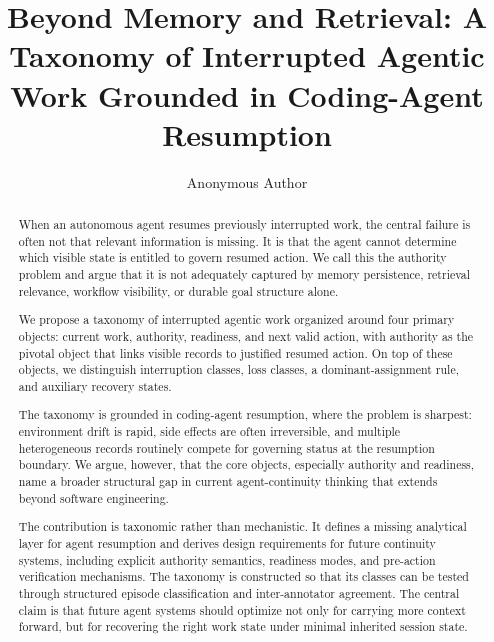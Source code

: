 \documentclass[a4paper,fleqn]{cas-dc}
\begin{document}
\let\WriteBookmarks\relax
\def\floatpagepagefraction{1}
\def\textpagefraction{.001}
\setlength{\stripsep}{8pt plus 2pt minus 2pt}

\title[mode=title]{Beyond Memory and Retrieval: A Taxonomy of Interrupted Agentic Work Grounded in Coding-Agent Resumption}

\author[1]{Anonymous Author}

\begin{abstract}
When an autonomous agent resumes previously interrupted work, the central failure is often not that relevant information is missing. It is that the agent cannot determine which visible state is entitled to govern resumed action. We call this the authority problem and argue that it is not adequately captured by memory persistence, retrieval relevance, workflow visibility, or durable goal structure alone.

We propose a taxonomy of interrupted agentic work organized around four primary objects: current work, authority, readiness, and next valid action, with authority as the pivotal object that links visible records to justified resumed action. On top of these objects, we distinguish interruption classes, loss classes, a dominant-assignment rule, and auxiliary recovery states.

The taxonomy is grounded in coding-agent resumption, where the problem is sharpest: environment drift is rapid, side effects are often irreversible, and multiple heterogeneous records routinely compete for governing status at the resumption boundary. We argue, however, that the core objects, especially authority and readiness, name a broader structural gap in current agent-continuity thinking that extends beyond software engineering.

The contribution is taxonomic rather than mechanistic. It defines a missing analytical layer for agent resumption and derives design requirements for future continuity systems, including explicit authority semantics, readiness modes, and pre-action verification mechanisms. The taxonomy is constructed so that its classes can be tested through structured episode classification and inter-annotator agreement. The central claim is that future agent systems should optimize not only for carrying more context forward, but for recovering the right work state under minimal inherited session state.
\end{abstract}
\end{document}
